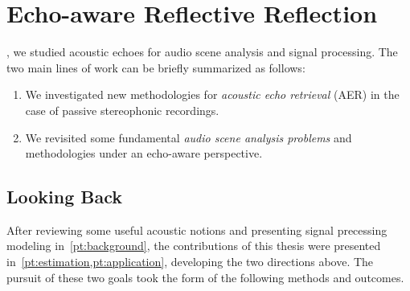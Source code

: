 \chapter{Echo-aware Reflective Reflection}\label{ch:conclusion}


\vspace{-2.5em}
, we studied acoustic echoes for audio scene analysis and signal processing.
The two main lines of work can be briefly summarized as follows:
\begin{enumerate}[label=\Alph*.]
    \item We investigated new methodologies for \textit{acoustic echo retrieval} (AER) in the case of passive stereophonic recordings.
    \item We revisited some fundamental \textit{audio scene analysis problems} and methodologies under an echo-aware perspective.
\end{enumerate}

\section{Looking Back}
After reviewing some useful acoustic notions and presenting signal precessing modeling in~\cref{pt:background}, the contributions of this thesis were presented in~\cref{pt:estimation,pt:application}, developing the two directions above.
The pursuit of these two goals took the form of the following methods and outcomes.

